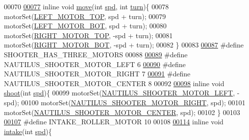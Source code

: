 \begin{DoxyCode}
00070 
\hypertarget{motors_8h_source.tex_l00077}{}\hyperlink{motors_8h_ae918d6900bfd9ad920597db4f3ff138f}{00077} \textcolor{keyword}{inline} \textcolor{keywordtype}{void} \hyperlink{motors_8h_ae918d6900bfd9ad920597db4f3ff138f}{move}(\textcolor{keywordtype}{int} \hyperlink{opcontrol_8c_a642ce334330c8b0f6e33dd0a3fa65111}{spd}, \textcolor{keywordtype}{int} \hyperlink{opcontrol_8c_aaefa47f4fdf865c2358c22b542a993e4}{turn})\{
00078     motorSet(\hyperlink{motors_8h_a3e06fbce97caed16e0a0f27f544587af}{LEFT\_MOTOR\_TOP}, spd + turn);
00079     motorSet(\hyperlink{motors_8h_a43691a92e03fa5319b14f01193f47b9a}{LEFT\_MOTOR\_BOT}, spd + turn);
00080     motorSet(\hyperlink{motors_8h_a306c5923dd0328c4bfc09255de9d124c}{RIGHT\_MOTOR\_TOP}, -spd + turn);
00081     motorSet(\hyperlink{motors_8h_a85c904d091f71ba7fc53a446524b6c61}{RIGHT\_MOTOR\_BOT}, -spd + turn);
00082 \}
00083 
\hypertarget{motors_8h_source.tex_l00087}{}\hyperlink{motors_8h_a7f78a80833903fca930b13a1f2ab6bd5}{00087} \textcolor{preprocessor}{#define SHOOTER\_HAS\_THREE\_MOTORS}
00088 
\hypertarget{motors_8h_source.tex_l00089}{}\hyperlink{motors_8h_a4a9fed3366effbbb942b907c131ae8bd}{00089} \textcolor{preprocessor}{#define NAUTILUS\_SHOOTER\_MOTOR\_LEFT 6}
\hypertarget{motors_8h_source.tex_l00090}{}\hyperlink{motors_8h_a3fa3054b1d74b733800c7b9252362334}{00090} \textcolor{preprocessor}{#define NAUTILUS\_SHOOTER\_MOTOR\_RIGHT 7}
\hypertarget{motors_8h_source.tex_l00091}{}\hyperlink{motors_8h_a681ecbcdbf9007fc5ccf3d67cdcfb505}{00091} \textcolor{preprocessor}{#define NAUTILUS\_SHOOTER\_MOTOR\_CENTER 8}
00092 
\hypertarget{motors_8h_source.tex_l00098}{}\hyperlink{motors_8h_ab183a9a4e6e469515b9f283f7156f843}{00098} \textcolor{keyword}{inline} \textcolor{keywordtype}{void} \hyperlink{motors_8h_ab183a9a4e6e469515b9f283f7156f843}{shoot}(\textcolor{keywordtype}{int} \hyperlink{opcontrol_8c_a642ce334330c8b0f6e33dd0a3fa65111}{spd})\{
00099     motorSet(\hyperlink{motors_8h_a4a9fed3366effbbb942b907c131ae8bd}{NAUTILUS\_SHOOTER\_MOTOR\_LEFT}, -spd);
00100     motorSet(\hyperlink{motors_8h_a3fa3054b1d74b733800c7b9252362334}{NAUTILUS\_SHOOTER\_MOTOR\_RIGHT}, spd);
00101     motorSet(\hyperlink{motors_8h_a681ecbcdbf9007fc5ccf3d67cdcfb505}{NAUTILUS\_SHOOTER\_MOTOR\_CENTER}, spd);
00102 \}
00103 
\hypertarget{motors_8h_source.tex_l00107}{}\hyperlink{motors_8h_a8ac783dc4e09804d3b2f7e3b6bbecad7}{00107} \textcolor{preprocessor}{#define INTAKE\_ROLLER\_MOTOR 10}
00108 
\hypertarget{motors_8h_source.tex_l00114}{}\hyperlink{motors_8h_ad29bed7d7fa6127b3ecf7e50eab23e9c}{00114} \textcolor{keyword}{inline} \textcolor{keywordtype}{void} \hyperlink{motors_8h_ad29bed7d7fa6127b3ecf7e50eab23e9c}{intake}(\textcolor{keywordtype}{int} \hyperlink{opcontrol_8c_a642ce334330c8b0f6e33dd0a3fa65111}{spd})\{

\end{DoxyCode}
